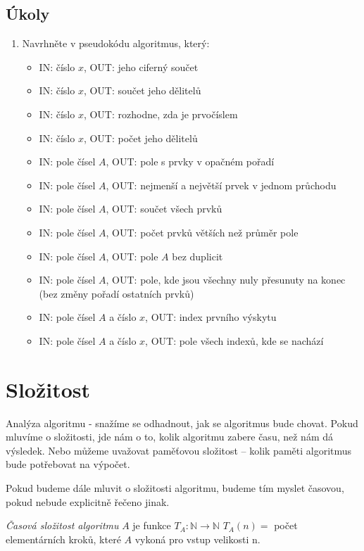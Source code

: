 \documentclass[openany,12pt,a4paper]{book}
\begin{document}
\section{Úkoly}
\begin{enumerate}
	\item Navrhněte v pseudokódu algoritmus, který:
		\begin{itemize}
			\item IN: číslo $x$, OUT: jeho ciferný součet
			\item IN: číslo $x$, OUT: součet jeho dělitelů
			\item IN: číslo $x$, OUT: rozhodne, zda je prvočíslem
			\item IN: číslo $x$, OUT: počet jeho dělitelů
			\item IN: pole čísel $A$, OUT: pole s prvky v opačném pořadí
			\item IN: pole čísel $A$, OUT: nejmenší a největší prvek v jednom průchodu
			\item IN: pole čísel $A$, OUT: součet všech prvků
			\item IN: pole čísel $A$, OUT: počet prvků větších než průměr pole
			\item IN: pole čísel $A$, OUT: pole $A$ bez duplicit
			\item IN: pole čísel $A$, OUT: pole, kde jsou všechny nuly přesunuty na konec (bez změny pořadí ostatních prvků)
			\item IN: pole čísel $A$ a číslo $x$, OUT: index prvního výskytu
			\item IN: pole čísel $A$ a číslo $x$, OUT: pole všech indexů, kde se nachází
		\end{itemize}
\end{enumerate}



\chapter{Složitost}

Analýza algoritmu - snažíme se odhadnout, jak se algoritmus bude chovat.
Pokud mluvíme o složitosti, jde nám o to, kolik algoritmu zabere času, než nám dá výsledek.
Nebo můžeme uvažovat paměťovou složitost -- kolik paměti algoritmus bude potřebovat na výpočet.

Pokud budeme dále mluvit o složitosti algoritmu, budeme tím myslet časovou, pokud nebude explicitně řečeno jinak.

\begin{definition}
	\emph{Časová složitost algoritmu} $A$ je funkce $T_A: \mathbb{N} \rightarrow \mathbb{N}$
	$T_A(n) =$ počet elementárních kroků, které $A$ vykoná pro vstup velikosti n.
\end{definition}
\end{document}

